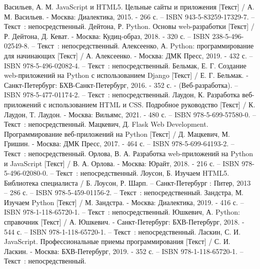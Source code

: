 
\begin{thebibliography}{9}

      Васильев, А. М. JavaScript и HTML5. Цельные сайты и приложения [Текст] / А. М. Васильев. - Москва: Диалектика, 2015. - 266 с. – ISBN 943-5-83259-17329-7. – Текст~: непосредственный.
     Дейтона, Р. Python. Основы web-разработки [Текст] / Р. Дейтона, Д. Кеват. - Москва: Кудиц-образ, 2018. - 320 с. – ISBN 238-5-496-02549-8. – Текст~: непосредственный.
      Алексеенко, А. Python: программирование для начинающих [Текст] / А. Алексеенко. - Москва: ДМК Пресс, 2019. - 432 с. – ISBN 978-5-496-02082-4. – Текст~: непосредственный.
    	Бельмак, Е. Г. Создание web-приложений на Python с использованием Django [Текст] / Е. Г. Бельмак. - Санкт-Петербург: БХВ-Санкт-Петербург, 2016. - 352 с. - (Веб-разработка). – ISBN 978-5-477-01174-2. – Текст~: непосредственный.
		Лаудон, К. Разработка веб-приложений с использованием HTML и CSS. Подробное руководство [Текст] / К. Лаудон, Т. Лаудон. - Москва: Вильямс, 2021. - 480 с. – ISBN 978-5-699-57580-0. – Текст~: непосредственный.
	 Мацкевич, Д. Flask Web Development. Программирование веб-приложений на Python [Текст] / Д. Мацкевич, М. Гришин. - Москва: ДМК Пресс, 2017. - 464 с. – ISBN 978-5-699-64193-2. – Текст~: непосредственный.
		Орлова, В. А. Разработка web-приложений на Python и JavaScript [Текст] / В. А. Орлова. - Москва: Юрайт, 2018. - 216 с. – ISBN 978-5-496-02080-0. – Текст~: непосредственный.
		Лоусон, Б. Изучаем HTML5. Библиотека специалиста / Б. Лоусон, Р. Шарп. – Санкт-Петербург : Питер, 2013 – 286 с. – ISBN 978-5-459-01156-2. – Текст~: непосредственный.
		Зандстра, М. Изучаем Python [Текст] / М. Зандстра. - Москва: Диалектика, 2019. - 416 с. – ISBN 978-1-118-65720-1. – Текст~: непосредственный.    
		 Юшкевич, А. Python: справочник [Текст] / А. Юшкевич. - Санкт-Петербург: БХВ-Петербург, 2018. - 544 с. – ISBN 978-1-118-65720-1. – Текст~: непосредственный.    
		Ласкин, С. И. JavaScript. Профессиональные приемы программирования [Текст] / С. И. Ласкин. - Москва: БХВ-Петербург, 2019. - 352 с. – ISBN 978-1-118-65720-1. – Текст~: непосредственный.    
\end{thebibliography}
